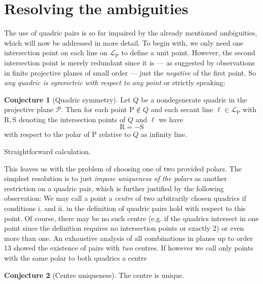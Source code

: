 \documentclass[12pt,english,paper=a4,DIV=12,headings=small,numbers=noenddot,parskip=half]{scrartcl}
\theoremstyle{definition}
\newtheorem{conj}{Conjecture}
\renewenvironment{proof}{{\itshape Idea of proof.}}{}
\begin{document}
\section{Resolving the ambiguities}
The use of quadric pairs is so far impaired by the already mentioned ambiguities, which will now be addressed in more detail. To begin with, we only need one intersection point on each line on $\mathscr{L}_\mathrm{P}$ to define a unit point. However, the second intersection point is merely redundant since it is --- as suggested by observations in finite projective planes of small order --- just the \emph{negative} of the first point. So \emph{any quadric is symmetric with respect to any point} or strictly speaking:

\begin{conj}[Quadric symmetry]
Let $Q$ be a nondegenerate quadric in the projective plane $\mathscr{P}$. Then for each point $\mathrm{P}\notin Q$ and each secant line $\ell\in\mathscr{L}_\mathrm{P}$ with $\mathrm{R}, \mathrm{S}$ denoting the intersection points of $Q$ and $\ell$ we have
\begin{equation*}
\mathrm{R} = -\mathrm{S}
\end{equation*}
with respect to the polar of $\mathrm{P}$ relative to $Q$ as infinity line.

\begin{proof}
Straightforward calculation.
\end{proof}
\end{conj}

This leaves us with the problem of choosing one of two provided polars. The simplest resolution is to just \emph{impose uniqueness of the polars} as another restriction on a quadric pair, which is further justified by the following observation: We may call a point a \emph{centre} of two arbitrarily chosen quadrics if conditions i. and ii. in the definition of quadric pairs hold with respect to this point. Of course, there may be no such centre (e.g. if the quadrics intersect in one point since the definition requires no intersection points or exactly 2) or even more than one. An exhaustive analysis of all combinations in planes up to order 13 showed the existence of pairs with \emph{two} centres. If however we call only points with the same polar to both quadrics a centre

\begin{conj}[Centre uniqueness]
The centre is unique.
\end{conj}



\end{document}
